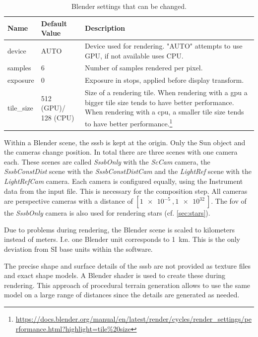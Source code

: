 \begin{table}[htpb]
    \centering
    \caption{Blender settings that can be changed.}
    \label{tab:blender_settings_input}
        \begin{tabular}{p{}|p{}|p{}}
        \textbf{Name}       & \textbf{Default Value} & \textbf{Description} \\ \hline
        device     & AUTO          & Device used for rendering. "AUTO" attempts to use GPU, if not available uses CPU. \\
        samples    & 6             & Number of samples rendered per pixel.\\
        exposure   & 0             & Exposure in stops, applied before display transform. \\
        tile\_size & 512 (GPU)/ 128 (CPU)       & Size of a rendering tile. When rendering with a \gls{gpu} a bigger tile size tends to have better performance. When rendering with a \gls{cpu}, a smaller tile size tends to have better performance.\footnote{\url{https://docs.blender.org/manual/en/latest/render/cycles/render\_settings/performance.html?highlight=tile\%20size}}
    \end{tabular}
\end{table}

Within a Blender scene, the \gls{sssb} is kept at the origin. Only the Sun object and the cameras change position. In total there are three scenes with one camera each. These scenes are called \textit{SssbOnly} with the \textit{ScCam} camera, the \textit{SssbConstDist} scene with the \textit{SssbConstDistCam} and the \textit{LightRef} scene with the \textit{LightRefCam} camera. Each camera is configured equally, using the Instrument data from the input file. This is necessary for the composition step. All cameras are perspective cameras with a distance of $[\SI{1e-5}{},\SI{1e32}{}]$. The \gls{fov} of the \textit{SssbOnly} camera is also used for rendering stars (cf. \ref{sec:stars}).

Due to problems during rendering, the Blender scene is scaled to kilometers instead of meters. I.e. one Blender unit corresponds to \SI{1}{\kilo\meter}. This is the only deviation from SI base units within the software.

The precise shape and surface details of the \gls{sssb} are not provided as texture files and exact shape models. A Blender shader is used to create these during rendering. This approach of procedural terrain generation allows to use the same model on a large range of distances since the details are generated as needed. 

